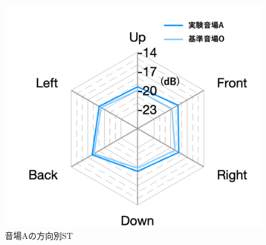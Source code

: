 \documentclass[11pt,a4j]{jreport}
\begin{document}
\begin{figure}[H]
\begin{minipage}[b]{.5\linewidth}
        \includegraphics[width=1\linewidth]{images/experimentField/withLegend/expALate.png}
    \end{minipage}
    \caption{音場Aの方向別ST}
    \label{fig:音場Aの方向別ST}
  \end{figure}
\end{document}
